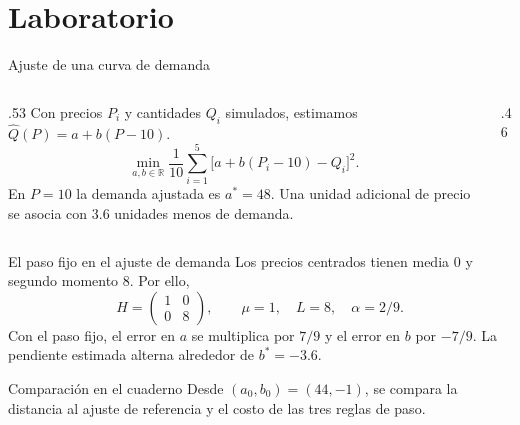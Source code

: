 \documentclass[aspectratio=169,12pt]{beamer}
\newcommand{\R}{\mathbb{R}}
\begin{document}
\section{Laboratorio}

\begin{frame}{Ajuste de una curva de demanda}
\begin{columns}[c,onlytextwidth]
\begin{column}{.53\textwidth}
Con precios $P_i$ y cantidades $Q_i$ simulados, estimamos
$\widehat Q(P)=a+b(P-10)$.
\[
 \min_{a,b\in\R}\frac1{10}
   \sum_{i=1}^{5}\bigl[a+b(P_i-10)-Q_i\bigr]^2 .
\]
En $P=10$ la demanda ajustada es $a^*=48$.
Una unidad adicional de precio se asocia con $3.6$ unidades menos de demanda.
\end{column}
\begin{column}{.46\textwidth}
\centering
{}
\end{column}
\end{columns}
\end{frame}

\begin{frame}{El paso fijo en el ajuste de demanda}
Los precios centrados tienen media $0$ y segundo momento $8$. Por ello,
\[
 H=\begin{pmatrix}1&0\\0&8\end{pmatrix},\qquad
 \mu=1,\quad L=8,\quad \alpha=2/9.
\]
Con el paso fijo, el error en $a$ se multiplica por $7/9$ y el error en
$b$ por $-7/9$. La pendiente estimada alterna alrededor de $b^*=-3.6$.
\begin{block}{Comparación en el cuaderno}
Desde $(a_0,b_0)=(44,-1)$, se compara la distancia al ajuste de
referencia y el costo de las tres reglas de paso.
\end{block}
\end{frame}
\end{document}
